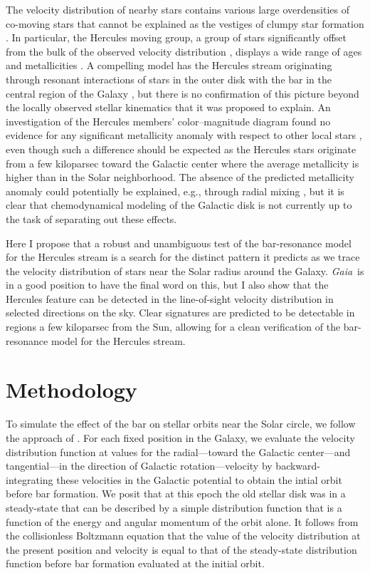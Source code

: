 \documentclass[12pt,preprint]{aastex}
\newcommand{\eg}{e.g.}
\newcommand{\Gaia}{\emph{Gaia}}
\begin{document}
The velocity distribution of nearby stars contains various large
overdensities of co-moving stars that cannot be explained as the
vestiges of clumpy star formation \citep[\eg,][]{Bovy10a}. In
particular, the Hercules moving group, a group of stars significantly
offset from the bulk of the observed velocity distribution
\citep[\eg,][see \figurename~\ref{fig:obs}]{Dehnen98b,Bovy09a},
displays a wide range of ages and metallicities
\citep{Blaauw70a,raboud98a,caloi99a,Bensby07a,Bovy10a}. A compelling
model has the Hercules stream originating through resonant
interactions of stars in the outer disk with the bar in the central
region of the Galaxy \citep{dehnen00a,fux01a}, but there is no
confirmation of this picture beyond the locally observed stellar
kinematics that it was proposed to explain. An investigation of the
Hercules members' color--magnitude diagram found no evidence for any
significant metallicity anomaly with respect to other local stars
\citep{Bovy10a}, even though such a difference should be expected as
the Hercules stars originate from a few kiloparsec toward the Galactic
center where the average metallicity is higher than in the Solar
neighborhood. The absence of the predicted metallicity anomaly could
potentially be explained, \eg, through radial mixing
\citep{sellwood02a}, but it is clear that chemodynamical modeling of
the Galactic disk is not currently up to the task of separating out
these effects.

Here I propose that a robust and unambiguous test of the bar-resonance
model for the Hercules stream is a search for the distinct pattern it
predicts as we trace the velocity distribution of stars near the Solar
radius around the Galaxy. \Gaia\ is in a good position to have the
final word on this, but I also show that the Hercules feature can be
detected in the line-of-sight velocity distribution in selected
directions on the sky. Clear signatures are predicted to be detectable
in regions a few kiloparsec from the Sun, allowing for a clean
verification of the bar-resonance model for the Hercules stream.


\section{Methodology}\label{sec:method}

To simulate the effect of the bar on stellar orbits near the Solar
circle, we follow the approach of \citet{dehnen00a}. For each fixed
position in the Galaxy, we evaluate the velocity distribution function
at values for the radial---toward the Galactic center---and
tangential---in the direction of Galactic rotation---velocity by
backward-integrating these velocities in the Galactic potential to
obtain the intial orbit before bar formation. We posit that at this
epoch the old stellar disk was in a steady-state that can be described
by a simple distribution function that is a function of the energy and
angular momentum of the orbit alone. It follows from the collisionless
Boltzmann equation that the value of the velocity distribution at the
present position and velocity is equal to that of the steady-state
distribution function before bar formation evaluated at the initial
orbit.
\end{document}
